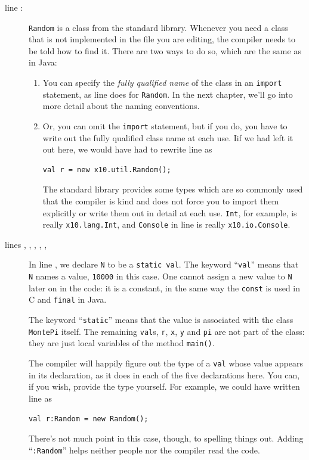\begin{description}
\item[line :] 
{\tt Random} is a class from the \Xten{}
standard library. Whenever you need a class that is not implemented in the file
you are editing, the compiler needs to be told how to find it.  There are two ways
to do so, which are the same as in Java:
\begin{enumerate}
\item 
You can specify the {\em fully qualified name} of the class in an {\tt import}
statement, as line  does for {\tt Random}. In the next
chapter, we'll go into more detail about the naming conventions. 

\item Or, you can omit the {\tt import} statement, 
but if you do, you have to write out
the fully qualified class name at each use.  Iif we had left it out
here, we would have had to rewrite line   as
\begin{verbatim}
val r = new x10.util.Random(); 
\end{verbatim}
The standard \Xten{} library provides some types which are so commonly
used that the compiler is kind and does not force you to import them
explicitly or write them out in detail at each use.  {\tt Int}, for example,
is really {\tt x10.lang.Int}, and {\tt Console} in line 
is really {\tt x10.io.Console}.
\end{enumerate}

\item[lines  ,  , 
 ,  ,  ,]
In line  , we declare {\tt N} to be a {\tt static val}.
The keyword ``{\tt val}'' means that {\tt N} names a value,
{\tt 10000} in this case.  One cannot assign a new value to 
{\tt N} later on in the code: it is a constant, in the same way the {\tt const}
is used in C and {\tt final} in Java.

The keyword ``{\tt static}'' means that the value is associated with the class
{\tt MontePi} itself. The remaining {\tt val}s, {\tt r}, {\tt x}, {\tt y} and
{\tt pi} are not part of the class: they are just local variables of the method
{\tt main()}.

The compiler will happily figure out the type of a {\tt val} whose
value appears in its declaration, as it does in each of the five declarations
here. You can, if you wish, provide the type yourself.
For example, we could have written line   as
\begin{verbatim}
val r:Random = new Random(); 
\end{verbatim}
There's not much point in this case, though, to spelling things out.
Adding ``{\tt :Random}'' helps neither people nor the compiler read the code. 


\end{description}
